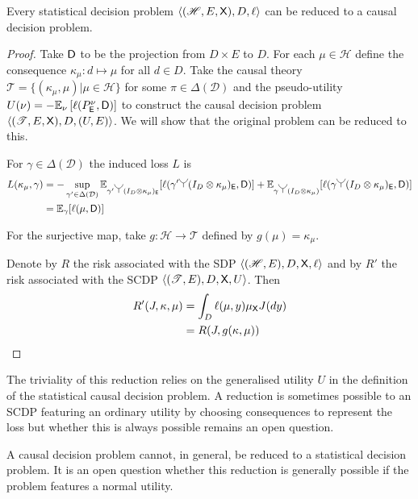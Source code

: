 \begin{theorem}\label{th:sdp_to_cdp}
Every statistical decision problem $\langle (\mathscr{H},E,\mathsf{X}),D,\ell\rangle$ can be reduced to a causal decision problem.
\end{theorem}
\begin{proof}
Take $\mathsf{D}$ to be the projection from $D\times E$ to $D$. For each $\mu\in \mathscr{H}$ define the consequence $\kappa_\mu:d\mapsto \mu$ for all $d\in D$. Take the causal theory $\mathscr{T}=\{(\kappa_\mu,\mu)|\mu\in \mathscr{H}\}$ for some $\pi\in \Delta(\mathcal{D})$ and the pseudo-utility $U(\nu) = -\mathbb{E}_\nu \left[\ell(P^\nu_{\mathsf{E}},\mathsf{D})\right]$ to construct the causal decision problem $\langle (\mathscr{T},E,\mathsf{X}),D,(U,E)\rangle$. We will show that the original problem can be reduced to this.

For $\gamma\in \Delta(\mathcal{D})$ the induced loss $L$ is
\begin{align}
    L(\kappa_\mu,\gamma) &= -\sup_{\gamma'\in \Delta(\mathcal{D})} \mathbb{E}_{\gamma' \splitter{0.15}(I_D\otimes \kappa_\mu)_{\RV{E}}}[\ell(\gamma'\splitter{0.15}(I_D\otimes \kappa_\mu)_{\RV{E}},\RV{D})] + \mathbb{E}_{\gamma \splitter{0.15}(I_D\otimes \kappa_\mu)}[\ell(\gamma \splitter{0.15}(I_D\otimes \kappa_\mu)_{\RV{E}},\RV{D})]\\
                     &= \mathbb{E}_{\gamma}[\ell(\mu,\RV{D})]
\end{align}

For the surjective map, take $g:\mathscr{H}\to \mathscr{T}$ defined by $g(\mu)=\kappa_\mu$.

Denote by $R$ the risk associated with the SDP $\langle (\mathscr{H},E),D,\mathsf{X},\ell\rangle$ and by $R'$ the risk associated with the SCDP $\langle (\mathscr{T},E),D,\mathsf{X},U\rangle$. Then
\begin{align}
    R'(J,\kappa,\mu) &= \int_D \ell(\mu, y) \mu_{\mathsf{X}} J(dy)\\
                   &=R(J,g(\kappa,\mu))
\end{align}
\end{proof}

The triviality of this reduction relies on the generalised utility $U$ in the definition of the statistical causal decision problem. A reduction is sometimes possible to an SCDP featuring an ordinary utility by choosing consequences to represent the loss but whether this is always possible remains an open question.

A causal decision problem cannot, in general, be reduced to a statistical decision problem. It is an open question whether this reduction is generally possible if the problem features a normal utility.

